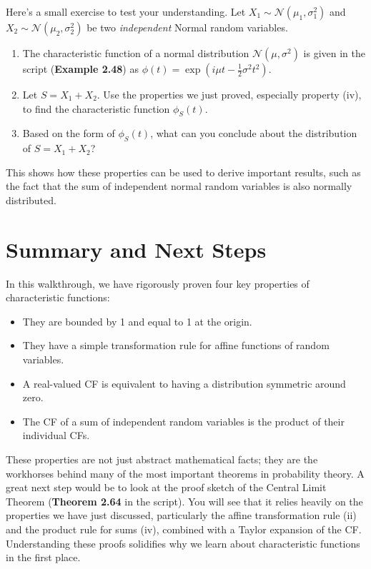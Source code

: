 \documentclass[11pt,a4paper]{article}
\begin{document}
\noindent
Here's a small exercise to test your understanding. Let $X_1 \sim \mathcal{N}(\mu_1, \sigma_1^2)$ and $X_2 \sim \mathcal{N}(\mu_2, \sigma_2^2)$ be two \textit{independent} Normal random variables.
\begin{enumerate}
    \item The characteristic function of a normal distribution $\mathcal{N}(\mu, \sigma^2)$ is given in the script (\textbf{Example 2.48}) as $\phi(t) = \exp(i\mu t - \frac{1}{2}\sigma^2 t^2)$.
    \item Let $S = X_1 + X_2$. Use the properties we just proved, especially property (iv), to find the characteristic function $\phi_S(t)$.
    \item Based on the form of $\phi_S(t)$, what can you conclude about the distribution of $S = X_1 + X_2$?
\end{enumerate}
This shows how these properties can be used to derive important results, such as the fact that the sum of independent normal random variables is also normally distributed.

\section{Summary and Next Steps}

In this walkthrough, we have rigorously proven four key properties of characteristic functions:
\begin{itemize}
    \item They are bounded by 1 and equal to 1 at the origin.
    \item They have a simple transformation rule for affine functions of random variables.
    \item A real-valued CF is equivalent to having a distribution symmetric around zero.
    \item The CF of a sum of independent random variables is the product of their individual CFs.
\end{itemize}

These properties are not just abstract mathematical facts; they are the workhorses behind many of the most important theorems in probability theory.
A great next step would be to look at the proof sketch of the Central Limit Theorem (\textbf{Theorem 2.64} in the script). You will see that it relies heavily on the properties we have just discussed, particularly the affine transformation rule (ii) and the product rule for sums (iv), combined with a Taylor expansion of the CF. Understanding these proofs solidifies why we learn about characteristic functions in the first place.
\end{document}
